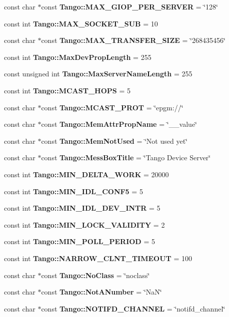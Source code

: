\begin{DoxyCompactItemize}
\item 
const char $\ast$const {\bf Tango\-::\-M\-A\-X\-\_\-\-G\-I\-O\-P\-\_\-\-P\-E\-R\-\_\-\-S\-E\-R\-V\-E\-R} = \char`\"{}128\char`\"{}
\item 
const int {\bf Tango\-::\-M\-A\-X\-\_\-\-S\-O\-C\-K\-E\-T\-\_\-\-S\-U\-B} = 10
\item 
const char $\ast$const {\bf Tango\-::\-M\-A\-X\-\_\-\-T\-R\-A\-N\-S\-F\-E\-R\-\_\-\-S\-I\-Z\-E} = \char`\"{}268435456\char`\"{}
\item 
const int {\bf Tango\-::\-Max\-Dev\-Prop\-Length} = 255
\item 
const unsigned int {\bf Tango\-::\-Max\-Server\-Name\-Length} = 255
\item 
const int {\bf Tango\-::\-M\-C\-A\-S\-T\-\_\-\-H\-O\-P\-S} = 5
\item 
const char $\ast$const {\bf Tango\-::\-M\-C\-A\-S\-T\-\_\-\-P\-R\-O\-T} = \char`\"{}epgm\-://\char`\"{}
\item 
const char $\ast$const {\bf Tango\-::\-Mem\-Attr\-Prop\-Name} = \char`\"{}\-\_\-\-\_\-value\char`\"{}
\item 
const char $\ast$const {\bf Tango\-::\-Mem\-Not\-Used} = \char`\"{}Not used yet\char`\"{}
\item 
const char $\ast$const {\bf Tango\-::\-Mess\-Box\-Title} = \char`\"{}Tango Device Server\char`\"{}
\item 
const int {\bf Tango\-::\-M\-I\-N\-\_\-\-D\-E\-L\-T\-A\-\_\-\-W\-O\-R\-K} = 20000
\item 
const int {\bf Tango\-::\-M\-I\-N\-\_\-\-I\-D\-L\-\_\-\-C\-O\-N\-F5} = 5
\item 
const int {\bf Tango\-::\-M\-I\-N\-\_\-\-I\-D\-L\-\_\-\-D\-E\-V\-\_\-\-I\-N\-T\-R} = 5
\item 
const int {\bf Tango\-::\-M\-I\-N\-\_\-\-L\-O\-C\-K\-\_\-\-V\-A\-L\-I\-D\-I\-T\-Y} = 2
\item 
const int {\bf Tango\-::\-M\-I\-N\-\_\-\-P\-O\-L\-L\-\_\-\-P\-E\-R\-I\-O\-D} = 5
\item 
const int {\bf Tango\-::\-N\-A\-R\-R\-O\-W\-\_\-\-C\-L\-N\-T\-\_\-\-T\-I\-M\-E\-O\-U\-T} = 100
\item 
const char $\ast$const {\bf Tango\-::\-No\-Class} = \char`\"{}noclass\char`\"{}
\item 
const char $\ast$const {\bf Tango\-::\-Not\-A\-Number} = \char`\"{}Na\-N\char`\"{}
\item 
const char $\ast$const {\bf Tango\-::\-N\-O\-T\-I\-F\-D\-\_\-\-C\-H\-A\-N\-N\-E\-L} = \char`\"{}notifd\-\_\-channel\char`\"{}

\end{DoxyCompactItemize}
